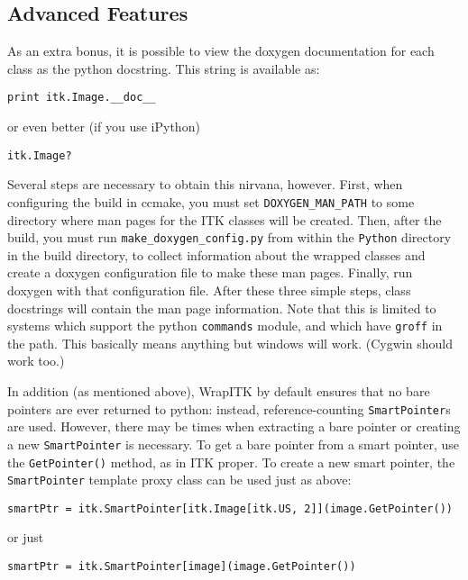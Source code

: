 \documentclass{InsightArticle}
\begin{document}
     \subsection{Advanced Features}

As an extra bonus, it is possible to view the doxygen documentation for each
class as the python docstring. This string is available as:
\small \begin{verbatim}
print itk.Image.__doc__
\end{verbatim} \normalsize
or even better (if you use iPython)
\small \begin{verbatim}
itk.Image?
\end{verbatim} \normalsize

Several steps are necessary to obtain this nirvana, however. First, when
configuring the build in ccmake, you must set \verb$DOXYGEN_MAN_PATH$ to some directory
where man pages for the ITK classes will be created. Then, after the build, you
must run \verb$make_doxygen_config.py$ from within the \verb$Python$ directory in the build
directory, to collect information about the wrapped classes and create a doxygen
configuration file to make these man pages. Finally, run doxygen with that
configuration file. After these three simple steps, class docstrings will
contain the man page information. Note that this is limited to systems which
support the python \verb$commands$ module, and which have \verb$groff$ in the path. This
basically means anything but windows \cite{WindowsWebSite} will work. (Cygwin should work too.)

In addition (as mentioned above), WrapITK by default ensures that no bare
pointers are ever returned to python: instead, reference-counting \verb$SmartPointer$s
are used. However, there may be times when extracting a bare pointer or creating
a new \verb$SmartPointer$ is necessary. To get a bare pointer from a smart pointer, use
the \verb$GetPointer()$ method, as in ITK proper. To create a new smart pointer, the
\verb$SmartPointer$ template proxy class can be used just as above:
\small \begin{verbatim}
smartPtr = itk.SmartPointer[itk.Image[itk.US, 2]](image.GetPointer())
\end{verbatim} \normalsize
or just
\small \begin{verbatim}
smartPtr = itk.SmartPointer[image](image.GetPointer())
\end{verbatim} \normalsize
\end{document}
